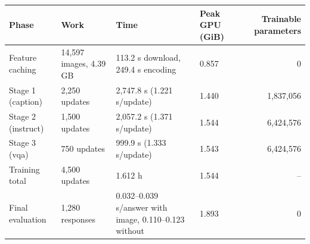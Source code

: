 \begin{tabular}{llllr}
\toprule
Phase & Work & Time & Peak GPU (GiB) & Trainable parameters \\
\midrule
Feature caching & 14,597 images, 4.39 GB & 113.2 s download, 249.4 s encoding & 0.857 & 0 \\
Stage 1 (caption) & 2,250 updates & 2,747.8 s (1.221 s/update) & 1.440 & 1,837,056 \\
Stage 2 (instruct) & 1,500 updates & 2,057.2 s (1.371 s/update) & 1.544 & 6,424,576 \\
Stage 3 (vqa) & 750 updates & 999.9 s (1.333 s/update) & 1.543 & 6,424,576 \\
Training total & 4,500 updates & 1.612 h & 1.544 & -- \\
Final evaluation & 1,280 responses & 0.032--0.039 s/answer with image, 0.110--0.123 without & 1.893 & 0 \\
\bottomrule
\end{tabular}